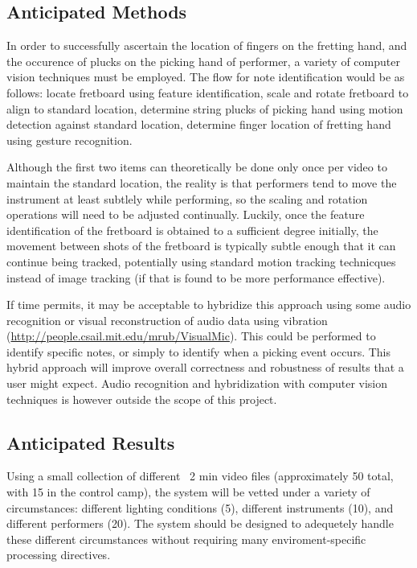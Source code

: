 \subsection{Anticipated Methods}
In order to successfully ascertain the location of fingers on the fretting hand, 
and the occurence of plucks on the picking hand of performer,
a variety of computer vision techniques must be employed.
The flow for note identification would be as follows:
locate fretboard using feature identification,
scale and rotate fretboard to align to standard location,
determine string plucks of picking hand using motion detection against standard location,
determine finger location of fretting hand using gesture recognition.
\par
Although the first two items can theoretically be done only once per video to maintain the standard location, 
the reality is that performers tend to move the instrument at least subtlely while performing,
so the scaling and rotation operations will need to be adjusted continually.
Luckily, once the feature identification of the fretboard is obtained to a sufficient degree initially,
the movement between shots of the fretboard is typically subtle enough that it can continue being tracked,
potentially using standard motion tracking technicques instead of image tracking
(if that is found to be more performance effective).
\par
If time permits, it may be acceptable to hybridize this approach using some audio recognition
or visual reconstruction of audio data using vibration (\url{http://people.csail.mit.edu/mrub/VisualMic}).
This could be performed to identify specific notes, or simply to identify when a picking event occurs.
This hybrid approach will improve overall correctness and robustness of results that a user might expect.
Audio recognition and hybridization with computer vision techniques is however outside the scope of this project.

\subsection{Anticipated Results}
Using a small collection of different ~2 min video files
(approximately 50 total, with 15 in the control camp),
the system will be vetted under a variety of circumstances:
different lighting conditions (5),
different instruments (10),
and different performers (20).
The system should be designed to adequetely handle these different circumstances
without requiring many enviroment-specific processing directives.

